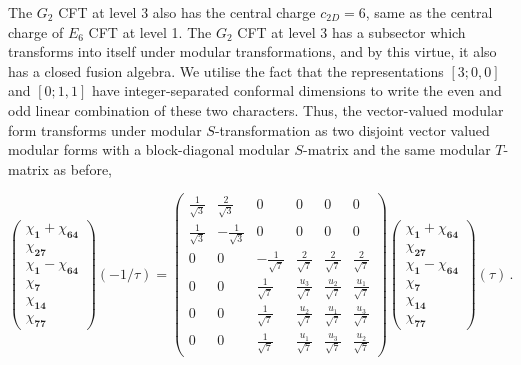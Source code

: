 \documentclass[a4paper,12pt]{article}
\begin{document}
The $G_2$ CFT at level 3 also has the central charge $c_{2D}=6$, same as the central charge of $E_6$ CFT at level 1. The $G_2$ CFT at level 3 has a subsector which transforms into itself under modular transformations, and by this virtue, it also has a closed fusion algebra. We utilise the fact that the representations  $[3;0,0]$ and $[0;1,1]$ have integer-separated conformal dimensions to write the even and odd linear combination of these two characters. Thus, the vector-valued modular form transforms under modular $S$-transformation as two disjoint vector valued modular forms with a block-diagonal modular $S$-matrix and the same modular $T$-matrix as before,

\begin{equation}\label{g2_3_s_matrix}
    \begin{pmatrix}
        \chi_{\mathbf{1}}+\chi_{\mathbf{64}}\\
        \chi_{\mathbf{27}}\\
        \chi_{\mathbf{1}}-\chi_{\mathbf{64}}\\
        \chi_{\mathbf{7}}\\
        \chi_{\mathbf{14}}\\
        \chi_{\mathbf{77}}
    \end{pmatrix}(-1/\tau)=\begin{pmatrix}
\frac{1}{\sqrt{3}} & \frac{2}{\sqrt{3}} & 0 & 0 & 0& 0\\
\frac{1}{\sqrt{3}} & -\frac{1}{\sqrt{3}} & 0 & 0 & 0 & 0 \\
0 & 0 & -\frac{1}{\sqrt{7}} & \frac{2}{\sqrt{7}} & \frac{2}{\sqrt{7}} & \frac{2}{\sqrt{7}} \\
0 & 0 & \frac{1}{\sqrt{7}} & \frac{u_3}{\sqrt{7}} & \frac{u_2}{\sqrt{7}} & \frac{u_1}{\sqrt{7}} \\
0 & 0 & \frac{1}{\sqrt{7}} & \frac{u_2}{\sqrt{7}} & \frac{u_1}{\sqrt{7}} & \frac{u_3}{\sqrt{7}} \\
0 & 0 & \frac{1}{\sqrt{7}} & \frac{u_1}{\sqrt{7}} & \frac{u_3}{\sqrt{7}} & \frac{u_2}{\sqrt{7}}
\end{pmatrix}\begin{pmatrix}
        \chi_{\mathbf{1}}+\chi_{\mathbf{64}}\\
        \chi_{\mathbf{27}}\\
        \chi_{\mathbf{1}}-\chi_{\mathbf{64}}\\
        \chi_{\mathbf{7}}\\
        \chi_{\mathbf{14}}\\
        \chi_{\mathbf{77}}
    \end{pmatrix}(\tau)\, .
\end{equation}
\end{document}
